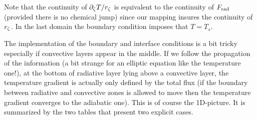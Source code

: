 Note that the continuity of $\partial_\zeta T/r_\zeta$ is equivalent to the
continuity of $F_{\rm rad}$ (provided there is no chemical jump) since our
mapping insures the continuity of $r_\zeta$. In the last domain the boundary
condition imposes that $T=T_s$.

The implementation of the boundary and interface conditions is a bit
tricky especially if convective layers appear in the middle. If we follow
the propagation of the information (a bit strange for an elliptic equation
like the temperature one!), at the bottom of radiative layer lying above
a convective layer, the temperature gradient is actually only defined
by the total flux (if the boundary between radiative and convective
zones is allowed to move then the temperature gradient converges to the
adiabatic one). This is of course the 1D-picture. It is summarized by
the two tables that present two explicit cases.

